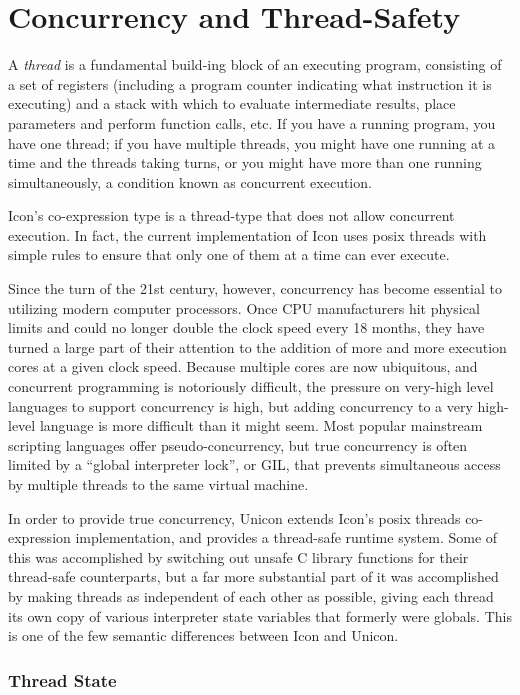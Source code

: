 \chapter{Concurrency and Thread-Safety}

A {\em thread\/} is a fundamental build-ing block of an executing
program, consisting of a set of registers (including a program counter
indicating what instruction it is executing) and a stack with which
to evaluate intermediate results, place parameters and perform
function calls, etc.  If you have a running program, you have one
thread; if you have multiple threads, you might have one running at
a time and the threads taking turns, or you might have more than one
running simultaneously, a condition known as concurrent execution.

Icon's co-expression type is a thread-type that does not allow
concurrent execution.  In fact, the current implementation of Icon
uses posix threads with simple rules to ensure that only one of them
at a time can ever execute.

Since the turn of the 21st century, however, concurrency has become
essential to utilizing modern computer processors.  Once CPU
manufacturers hit physical limits and could no longer double the
clock speed every 18 months, they have turned a large part of their
attention to the addition of more and more execution cores at a given
clock speed.  Because multiple cores are now ubiquitous, and
concurrent programming is notoriously difficult, the pressure on
very-high level languages to support concurrency is high, but
adding concurrency to a very high-level language is more difficult
than it might seem.  Most popular mainstream scripting languages
offer pseudo-concurrency, but true concurrency is often limited by
a ``global interpreter lock'', or GIL, that prevents simultaneous
access by multiple threads to the same virtual machine.

In order to provide true concurrency, Unicon extends Icon's posix
threads co-expression implementation, and provides a thread-safe
runtime system.  Some of this was accomplished by switching out unsafe
C library functions for their thread-safe counterparts, but a far more
substantial part of it was accomplished by making threads as
independent of each other as possible, giving each thread its own copy
of various interpreter state variables that formerly were
globals. This is one of the few semantic differences between Icon and
Unicon.

\subsection{Thread State}

